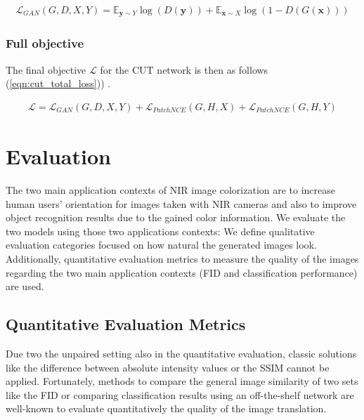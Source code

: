 \documentclass[a4paper,11pt, DIV=12]{scrartcl}
\newcommand{\x}{\boldsymbol{x}}
\newcommand{\y}{\boldsymbol{y}}
\begin{document}
\begin{equation}
   \label{eqn:cut_gan}
   \begin{aligned}
      \mathcal{L}_{GAN}(G, D, X, Y) = \mathbb{E}_{\y \sim Y}\log(D(\y)) +  \mathbb{E}_{\x \sim X}\log(1 - D(G(\x)))
   \end{aligned}
\end{equation}

\subsubsection*{Full objective}
The final objective $\mathcal{L}$ for the CUT network is then as follows (\autoref{eqn:cut_total_loss})) \cite{cut}.

\begin{equation}
   \label{eqn:cut_total_loss}
   \begin{aligned}
      \mathcal{L} = \mathcal{L}_{GAN}(G, D, X, Y) + \mathcal{L}_{PatchNCE}(G,H,X) + \mathcal{L}_{PatchNCE}(G,H,Y)
   \end{aligned}
\end{equation}

\section{Evaluation}
The two main application contexts of NIR image colorization are to increase human users' orientation for images taken with NIR cameras
and also to improve object recognition results due to the gained color information. We evaluate the two models using those two applications contexts:
We define qualitative evaluation categories focused on how natural the generated images look. Additionally, quantitative evaluation metrics to measure
the quality of the images regarding the two main application contexts (FID and classification performance) are used.

\subsection{Quantitative Evaluation Metrics}
Due two the unpaired setting also in the quantitative evaluation, classic solutions like the difference between absolute intensity values or the SSIM
\cite{ssim} cannot be applied. Fortunately, methods to compare the general image similarity of two sets like the FID \cite{ttur} or
comparing classification results using an off-the-shelf network are well-known to evaluate quantitatively the quality of the image translation.
\end{document}

